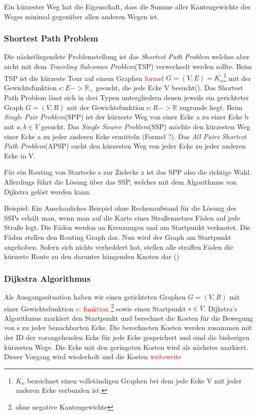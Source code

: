 \documentclass[10pt,a4paper]{article}
\newcommand\todo[1]{\textcolor{red}{#1}}
\begin{document}
Ein kürzester Weg hat die Eigenschaft, dass die Summe aller Kantengewichte des Weges minimal gegenüber allen anderen Wegen ist.

\subsubsection{Shortest Path Problem}
Die nächstliegendste Problemstellung ist das \textit{Shortest Path Problem} welches aber nicht mit dem \textit{Traveling Salesman Problem}(TSP) verwechselt werden sollte. Beim TSP ist die kürzeste Tour auf einem Graphen \todo{formel} $G  = (V,E) = K_{n}$\footnote{$K_{n}$ bezeichnet einen vollständigen Graphen bei dem jede Ecke V mit jeder anderen Ecke verbunden ist.} mit der Gewichtsfunktion $c: E -> \mathbb{R}_{+}$ gesucht, die jede Ecke V besucht(\cite[135]{algorithms}).
Das Shortest Path Problem lässt sich in drei Typen untergliedern denen jeweils ein gerichteter Graph $G = (V,R)$ mit der Gewichtsfunktion $c: R -> \mathbb{R}$ zugrunde liegt. Beim \textit{Single Pair Problem}(SPP) ist der kürzeste Weg von einer Ecke a zu einer Ecke b mit $a,b\in V$ gesucht. Das \textit{Single Source Problem}(SSP) möchte den kürzesten Weg einer Ecke a zu jeder anderen Ecke ermitteln (Formel ?). Das \textit{All Pairs Shortest Path Problem}(APSP) sucht den kürzesten Weg von jeder Ecke zu jeder anderen Ecke in V. \cite[169f]{algorithms}

Für ein Routing von Startecke s zur Zielecke z ist das SPP also die richtige Wahl. Allerdings führt die Lösung über das SSP, welches mit dem Algorithmus von Dijkstra gelöst werden kann.

Beispiel:
Ein Anschauliches Beispiel ohne Rechenaufwand für die Lösung des SSPs erhält man, wenn man auf die Karte eines Straßennetzes Fäden auf jede Straße legt. Die Fäden werden an Kreuzungen und am Startpunkt verknotet. Die Fäden stellen den Routing Graph dar. Nun wird der Graph am Startpunkt angehoben. Sofern sich nichts verheddert hat, stellen alle straffen Fäden die kürzeste Route zu den darunter hängenden Knoten dar (\cite[191]{kurt})


\subsubsection{Dijkstra Algorithmus}

Als Ausgangssituation haben wir einen gerichteten Graphen $G = (V,R)$ mit einer Gewichtsfunktion c: \todo{funktion} \footnote{ohne negative Kantengewichte} sowie einen Startpunkt $s \in V$. 
Dijkstra's Algorithmus markiert den Startpunkt und berechnet die Kosten für die Bewegung von s zu jeder benachbarten Ecke. Die berechneten Kosten werden zusammen mit der ID der vorangehenden Ecke für jede Ecke gespeichert und sind die bisherigen kürzesten Wege. Die Ecke mit den geringsten Kosten wird als nächstes markiert. Dieser Vorgang wird wiederholt und die Kosten \todo{writewrite}
\end{document}
